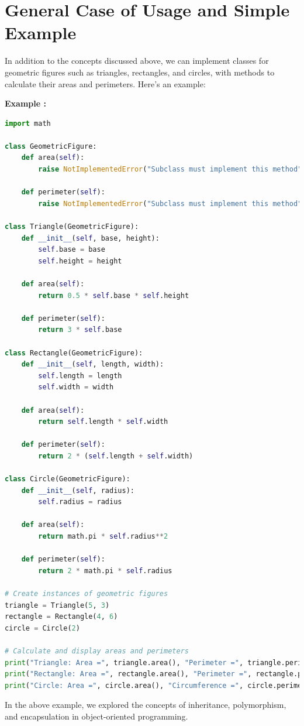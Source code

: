 \documentclass[12pt]{book}
\newtheorem{Example}{Example}[chapter]
\renewenvironment{Example}{\begin{trivlist}\item\relax
\textbf{Example \thesection: }}{\end{trivlist}}
\begin{document}
\section{General Case of Usage and Simple Example}

In addition to the concepts discussed above, we can implement classes for geometric figures such as triangles, rectangles, and circles, with methods to calculate their areas and perimeters. Here's an example:

\begin{Example}
\begin{lstlisting}[language=Python]
import math

class GeometricFigure:
    def area(self):
        raise NotImplementedError("Subclass must implement this method")

    def perimeter(self):
        raise NotImplementedError("Subclass must implement this method")

class Triangle(GeometricFigure):
    def __init__(self, base, height):
        self.base = base
        self.height = height

    def area(self):
        return 0.5 * self.base * self.height

    def perimeter(self):
        return 3 * self.base

class Rectangle(GeometricFigure):
    def __init__(self, length, width):
        self.length = length
        self.width = width

    def area(self):
        return self.length * self.width

    def perimeter(self):
        return 2 * (self.length + self.width)

class Circle(GeometricFigure):
    def __init__(self, radius):
        self.radius = radius

    def area(self):
        return math.pi * self.radius**2

    def perimeter(self):
        return 2 * math.pi * self.radius

# Create instances of geometric figures
triangle = Triangle(5, 3)
rectangle = Rectangle(4, 6)
circle = Circle(2)

# Calculate and display areas and perimeters
print("Triangle: Area =", triangle.area(), "Perimeter =", triangle.perimeter())
print("Rectangle: Area =", rectangle.area(), "Perimeter =", rectangle.perimeter())
print("Circle: Area =", circle.area(), "Circumference =", circle.perimeter())
\end{lstlisting}

\end{Example}
In the above example, we explored the concepts of inheritance, polymorphism, and encapsulation in object-oriented programming.
\end{document}
